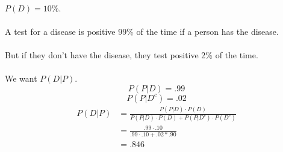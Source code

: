 \documentclass{article}
\begin{document}
\paragraph{}$P(D) = 10\%$.
\paragraph{}A test for a disease is positive 99\% of the time if a person has the disease. 

\paragraph{}But if they don't have the disease, they test positive 2\% of the time.

\paragraph{}We want $P(D|P)$. 
\begin{equation}
P(P|D) = .99
\end{equation}
\begin{equation}
    P(P|D^c) = .02
\end{equation}
\begin{align*}
    P(D|P) &= \frac{P(P|D)\cdot P(D)}{P(P|D)\cdot P(D)+P(P|D^c)\cdot P(D^c)}\\
           &= \frac{.99 \cdot .10}{.99 \cdot .10 + .02 * .90}\\
           &= .846
\end{align*}
\end{document}

